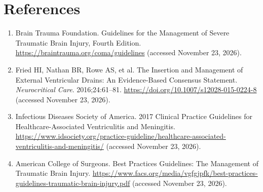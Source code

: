 \section*{References}
\begin{enumerate}
  \item Brain Trauma Foundation. Guidelines for the Management of Severe Traumatic Brain Injury, Fourth Edition. \url{https://braintrauma.org/coma/guidelines} (accessed November 23, 2026).
  \item Fried HI, Nathan BR, Rowe AS, et al. The Insertion and Management of External Ventricular Drains: An Evidence-Based Consensus Statement. \textit{Neurocritical Care}. 2016;24:61--81. \url{https://doi.org/10.1007/s12028-015-0224-8} (accessed November 23, 2026).
  \item Infectious Diseases Society of America. 2017 Clinical Practice Guidelines for Healthcare-Associated Ventriculitis and Meningitis. \url{https://www.idsociety.org/practice-guideline/healthcare-associated-ventriculitis-and-meningitis/} (accessed November 23, 2026).
  \item American College of Surgeons. Best Practices Guidelines: The Management of Traumatic Brain Injury. \url{https://www.facs.org/media/vgfgjpfk/best-practices-guidelines-traumatic-brain-injury.pdf} (accessed November 23, 2026).
\end{enumerate}

\clearpage
